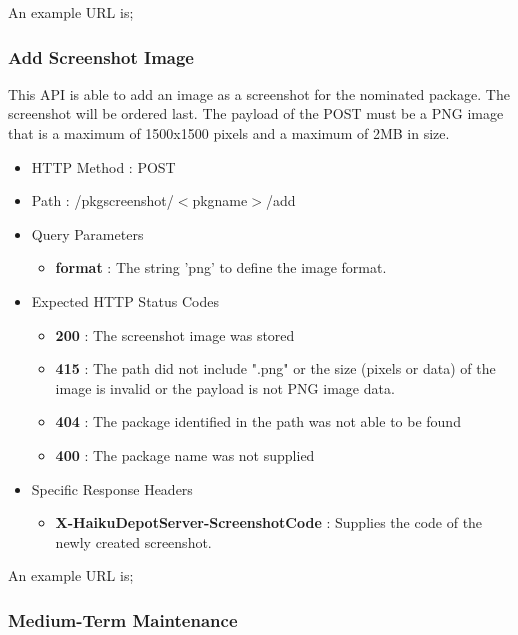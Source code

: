 An example URL is;


\subsubsection{Add Screenshot Image}

This API is able to add an image as a screenshot for the nominated package.  The screenshot will be ordered last.  The payload of the POST must be a PNG image that is a maximum of 1500x1500 pixels and a maximum of 2MB in size.

\begin{itemize}
\item HTTP Method : POST
\item Path : /pkgscreenshot/$<$pkgname$>$/add
\item Query Parameters
  \begin{itemize}
  \item {\bf format} : The string 'png' to define the image format.
  \end{itemize}
\item Expected HTTP Status Codes
  \begin{itemize}
  \item {\bf 200} : The screenshot image was stored
  \item {\bf 415} : The path did not include ".png" or the size (pixels or data) of the image is invalid or the payload is not PNG image data.
  \item {\bf 404} : The package identified in the path was not able to be found
  \item {\bf 400} : The package name was not supplied
  \end{itemize}
\item Specific Response Headers
  \begin{itemize}
  \item {\bf X-HaikuDepotServer-ScreenshotCode} : Supplies the code of the newly created screenshot.
  \end{itemize}
\end{itemize}

An example URL is;


\subsubsection{Medium-Term Maintenance}

